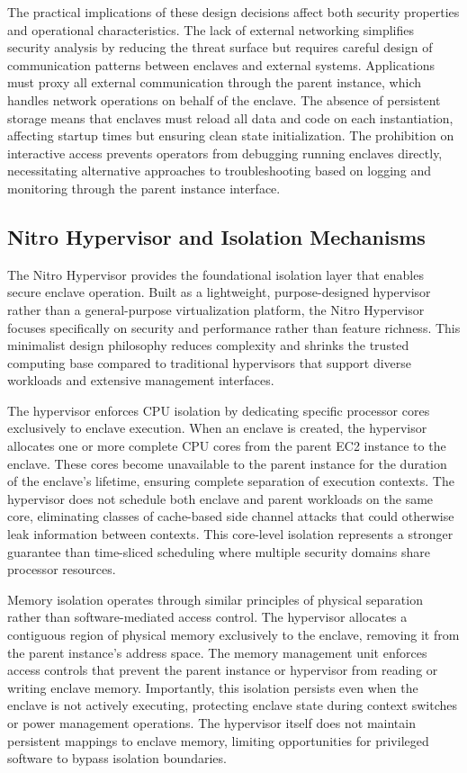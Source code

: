 The practical implications of these design decisions affect both security properties and operational characteristics. The lack of external networking simplifies security analysis by reducing the threat surface but requires careful design of communication patterns between enclaves and external systems. Applications must proxy all external communication through the parent instance, which handles network operations on behalf of the enclave. The absence of persistent storage means that enclaves must reload all data and code on each instantiation, affecting startup times but ensuring clean state initialization. The prohibition on interactive access prevents operators from debugging running enclaves directly, necessitating alternative approaches to troubleshooting based on logging and monitoring through the parent instance interface.

\subsection{Nitro Hypervisor and Isolation Mechanisms}

The Nitro Hypervisor provides the foundational isolation layer that enables secure enclave operation. Built as a lightweight, purpose-designed hypervisor rather than a general-purpose virtualization platform, the Nitro Hypervisor focuses specifically on security and performance rather than feature richness. This minimalist design philosophy reduces complexity and shrinks the trusted computing base compared to traditional hypervisors that support diverse workloads and extensive management interfaces.

The hypervisor enforces CPU isolation by dedicating specific processor cores exclusively to enclave execution. When an enclave is created, the hypervisor allocates one or more complete CPU cores from the parent EC2 instance to the enclave. These cores become unavailable to the parent instance for the duration of the enclave's lifetime, ensuring complete separation of execution contexts. The hypervisor does not schedule both enclave and parent workloads on the same core, eliminating classes of cache-based side channel attacks that could otherwise leak information between contexts. This core-level isolation represents a stronger guarantee than time-sliced scheduling where multiple security domains share processor resources.

Memory isolation operates through similar principles of physical separation rather than software-mediated access control. The hypervisor allocates a contiguous region of physical memory exclusively to the enclave, removing it from the parent instance's address space. The memory management unit enforces access controls that prevent the parent instance or hypervisor from reading or writing enclave memory. Importantly, this isolation persists even when the enclave is not actively executing, protecting enclave state during context switches or power management operations. The hypervisor itself does not maintain persistent mappings to enclave memory, limiting opportunities for privileged software to bypass isolation boundaries.

